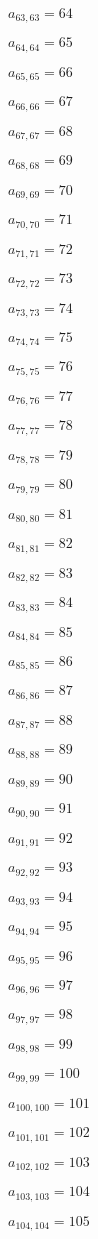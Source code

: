 \documentclass[a4paper,12pt]{article}
\begin{document}
$a _{ 63, 63 } = 64$

$a _{ 64, 64 } = 65$

$a _{ 65, 65 } = 66$

$a _{ 66, 66 } = 67$

$a _{ 67, 67 } = 68$

$a _{ 68, 68 } = 69$

$a _{ 69, 69 } = 70$

$a _{ 70, 70 } = 71$

$a _{ 71, 71 } = 72$

$a _{ 72, 72 } = 73$

$a _{ 73, 73 } = 74$

$a _{ 74, 74 } = 75$

$a _{ 75, 75 } = 76$

$a _{ 76, 76 } = 77$

$a _{ 77, 77 } = 78$

$a _{ 78, 78 } = 79$

$a _{ 79, 79 } = 80$

$a _{ 80, 80 } = 81$

$a _{ 81, 81 } = 82$

$a _{ 82, 82 } = 83$

$a _{ 83, 83 } = 84$

$a _{ 84, 84 } = 85$

$a _{ 85, 85 } = 86$

$a _{ 86, 86 } = 87$

$a _{ 87, 87 } = 88$

$a _{ 88, 88 } = 89$

$a _{ 89, 89 } = 90$

$a _{ 90, 90 } = 91$

$a _{ 91, 91 } = 92$

$a _{ 92, 92 } = 93$

$a _{ 93, 93 } = 94$

$a _{ 94, 94 } = 95$

$a _{ 95, 95 } = 96$

$a _{ 96, 96 } = 97$

$a _{ 97, 97 } = 98$

$a _{ 98, 98 } = 99$

$a _{ 99, 99 } = 100$

$a _{ 100, 100 } = 101$

$a _{ 101, 101 } = 102$

$a _{ 102, 102 } = 103$

$a _{ 103, 103 } = 104$

$a _{ 104, 104 } = 105$
\end{document}

